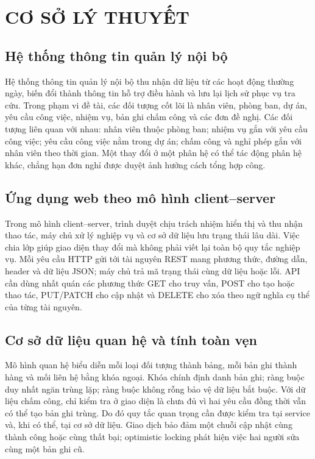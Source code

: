 \documentclass[12pt,a4paper,oneside]{report}
\begin{document}
\chapter{CƠ SỞ LÝ THUYẾT}
\section{Hệ thống thông tin quản lý nội bộ}
Hệ thống thông tin quản lý nội bộ thu nhận dữ liệu từ các hoạt động thường ngày, biến đổi thành thông tin hỗ trợ điều hành và lưu lại lịch sử phục vụ tra cứu. Trong phạm vi đề tài, các đối tượng cốt lõi là nhân viên, phòng ban, dự án, yêu cầu công việc, nhiệm vụ, bản ghi chấm công và các đơn đề nghị. Các đối tượng liên quan với nhau: nhân viên thuộc phòng ban; nhiệm vụ gắn với yêu cầu công việc; yêu cầu công việc nằm trong dự án; chấm công và nghỉ phép gắn với nhân viên theo thời gian. Một thay đổi ở một phân hệ có thể tác động phân hệ khác, chẳng hạn đơn nghỉ được duyệt ảnh hưởng cách tổng hợp công.

\section{Ứng dụng web theo mô hình client--server}
Trong mô hình client--server, trình duyệt chịu trách nhiệm hiển thị và thu nhận thao tác, máy chủ xử lý nghiệp vụ và cơ sở dữ liệu lưu trạng thái lâu dài. Việc chia lớp giúp giao diện thay đổi mà không phải viết lại toàn bộ quy tắc nghiệp vụ. Mỗi yêu cầu HTTP gửi tới tài nguyên REST mang phương thức, đường dẫn, header và dữ liệu JSON; máy chủ trả mã trạng thái cùng dữ liệu hoặc lỗi. API cần dùng nhất quán các phương thức GET cho truy vấn, POST cho tạo hoặc thao tác, PUT/PATCH cho cập nhật và DELETE cho xóa theo ngữ nghĩa cụ thể của từng tài nguyên.

\section{Cơ sở dữ liệu quan hệ và tính toàn vẹn}
Mô hình quan hệ biểu diễn mỗi loại đối tượng thành bảng, mỗi bản ghi thành hàng và mối liên hệ bằng khóa ngoại. Khóa chính định danh bản ghi; ràng buộc duy nhất ngăn trùng lặp; ràng buộc không rỗng bảo vệ dữ liệu bắt buộc. Với dữ liệu chấm công, chỉ kiểm tra ở giao diện là chưa đủ vì hai yêu cầu đồng thời vẫn có thể tạo bản ghi trùng. Do đó quy tắc quan trọng cần được kiểm tra tại service và, khi có thể, tại cơ sở dữ liệu. Giao dịch bảo đảm một chuỗi cập nhật cùng thành công hoặc cùng thất bại; optimistic locking phát hiện việc hai người sửa cùng một bản ghi cũ.
\end{document}
